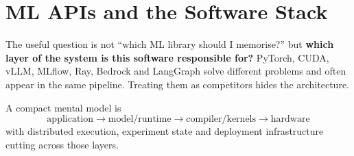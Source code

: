 
\chapter{ML APIs and the Software Stack}
\label{sec:ml-apis}

The useful question is not ``which ML library should I memorise?'' but \textbf{which layer of the system is this software responsible for?}
PyTorch, CUDA, vLLM, MLflow, Ray, Bedrock and LangGraph solve different problems and often appear in the same pipeline.
Treating them as competitors hides the architecture.

A compact mental model is
\[
\boxed{
\text{application}
\rightarrow
\text{model/runtime}
\rightarrow
\text{compiler/kernels}
\rightarrow
\text{hardware}
}
\]
with distributed execution, experiment state and deployment infrastructure cutting across those layers.

